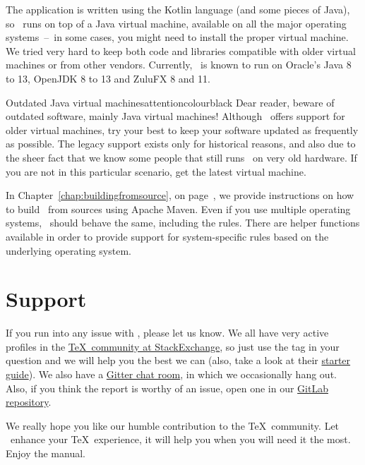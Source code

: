 The application is written using the Kotlin language (and some pieces of Java), so \arara\ runs on top of a Java virtual machine, available on all the major operating systems~--~in some cases, you might need to install the proper virtual machine. We tried very hard to keep both code and libraries compatible with older virtual machines or from other vendors. Currently, \arara\ is known to run on Oracle's Java 8 to 13, OpenJDK 8 to 13 and ZuluFX 8 and 11.

\begin{messagebox}{Outdated Java virtual machines}{attentioncolour}{\icerror}{black}
Dear reader, beware of outdated software, mainly Java virtual machines! Although \arara\ offers support for older virtual machines, try your best to keep your software updated as frequently as possible. The legacy support exists only for historical reasons, and also due to the sheer fact that we know some people that still runs \arara\ on very old hardware. If you are not in this particular scenario, get the latest virtual machine.
\end{messagebox}

In Chapter~\ref{chap:buildingfromsource}, on page~\pageref{chap:buildingfromsource}, we provide instructions on how to build \arara\ from sources using Apache Maven. Even if you use multiple operating systems, \arara\ should behave the same, including the rules. There are helper functions available in order to provide support for system-specific rules based on the underlying operating system.

\section{Support}
\label{sec:support}

If you run into any issue with \arara, please let us know. We all have very active profiles in the \href{https://tex.stackexchange.com/}{\TeX\ community at StackExchange}, so just use the  tag in your question and we will help you the best we can (also, take a look at their \href{https://tex.meta.stackexchange.com/q/1436}{starter guide}).  We also have a \href{https://gitter.im/Island-of-TeX/arara}{Gitter chat room}, in which we occasionally hang out. Also, if you think the report is worthy of an issue, open one in our \href{https://gitlab.com/islandoftex/arara/issues}{GitLab repository}.

We really hope you like our humble contribution to the \TeX\ community. Let \arara\ enhance your \TeX\ experience, it will help you when you will need it the most. Enjoy the manual.

